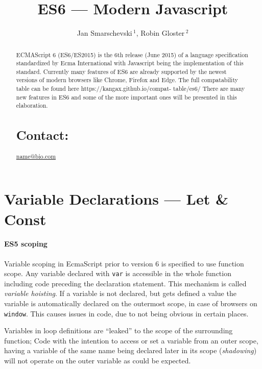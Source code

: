 \documentclass{bioinfo}
\begin{document}
\title[short Title]{ES6 --- Modern Javascript}
\author[Smarschevski, Gloster]{Jan Smarschevski\,$^{1}$, Robin Gloster\,$^{2}$}
\address{$^{1}$jan.smarschevski@tum.de\\
$^{2}$robin.gloster@tum.de}

\maketitle

\begin{abstract}
ECMAScript 6 (ES6/ES2015) is the 6th release (June 2015) of a language specification standardized by
Ecma International with Javascript being the implementation of this standard. Currently many
features of ES6 are already supported by the newest versions of modern browsers like Chrome,
Firefox and Edge. The full compatability table can be found here https://kangax.github.io/compat-
table/es6/
There are many new features in ES6 and some of the more important ones will be presented in this
elaboration.

\section{Contact:} \href{name@bio.com}{name@bio.com}
\end{abstract}

\section{Variable Declarations --- Let \& Const}
\paragraph{ES5 scoping\textcolon}
Variable scoping in EcmaScript prior to version 6 is specified to use function scope.
Any variable declared with {\tt var} is accessible in the whole function including
code preceding the declaration statement. This mechanism is called {\em variable hoisting}.
If a variable is not declared, but gets defined a value the variable is automatically declared
on the outermost scope, in case of browsers on {\tt window}. This causes issues in code, due
to not being obvious in certain places.

Variables in loop definitions are ``leaked'' to the scope of the surrounding function; Code
with the intention to access or set a variable from an outer scope, having a variable of
the same name being declared later in its scope ({\em shadowing}) will not operate on the
outer variable as could be expected.
\end{document}
